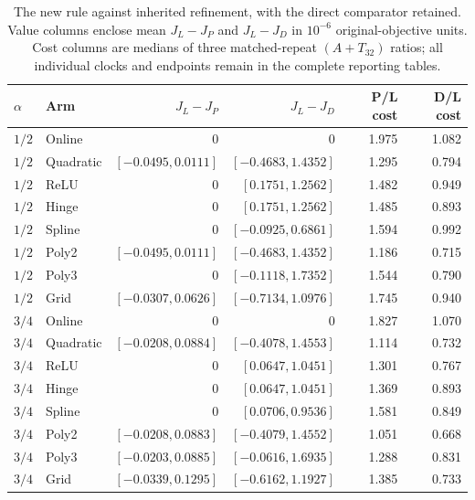 \begin{table}[htbp]
\centering\scriptsize
\setlength{\tabcolsep}{3pt}
\caption{The new rule against inherited refinement, with the direct comparator retained. Value columns enclose mean $J_L-J_P$ and $J_L-J_D$ in $10^{-6}$ original-objective units. Cost columns are medians of three matched-repeat $(A+T_{32})$ ratios; all individual clocks and endpoints remain in the complete reporting tables.}
\label{tab:incrementalcomparison120}
\begin{tabular}{llrrrr}
\toprule $\alpha$ & Arm & $J_L-J_P$ & $J_L-J_D$ & P/L cost & D/L cost \\ \midrule
$1/2$ & Online & $0$ & $0$ & 1.975 & 1.082 \\
$1/2$ & Quadratic & $[-0.0495, 0.0111]$ & $[-0.4683, 1.4352]$ & 1.295 & 0.794 \\
$1/2$ & ReLU & $0$ & $[0.1751, 1.2562]$ & 1.482 & 0.949 \\
$1/2$ & Hinge & $0$ & $[0.1751, 1.2562]$ & 1.485 & 0.893 \\
$1/2$ & Spline & $0$ & $[-0.0925, 0.6861]$ & 1.594 & 0.992 \\
$1/2$ & Poly2 & $[-0.0495, 0.0111]$ & $[-0.4683, 1.4352]$ & 1.186 & 0.715 \\
$1/2$ & Poly3 & $0$ & $[-0.1118, 1.7352]$ & 1.544 & 0.790 \\
$1/2$ & Grid & $[-0.0307, 0.0626]$ & $[-0.7134, 1.0976]$ & 1.745 & 0.940 \\
$3/4$ & Online & $0$ & $0$ & 1.827 & 1.070 \\
$3/4$ & Quadratic & $[-0.0208, 0.0884]$ & $[-0.4078, 1.4553]$ & 1.114 & 0.732 \\
$3/4$ & ReLU & $0$ & $[0.0647, 1.0451]$ & 1.301 & 0.767 \\
$3/4$ & Hinge & $0$ & $[0.0647, 1.0451]$ & 1.369 & 0.893 \\
$3/4$ & Spline & $0$ & $[0.0706, 0.9536]$ & 1.581 & 0.849 \\
$3/4$ & Poly2 & $[-0.0208, 0.0883]$ & $[-0.4079, 1.4552]$ & 1.051 & 0.668 \\
$3/4$ & Poly3 & $[-0.0203, 0.0885]$ & $[-0.0616, 1.6935]$ & 1.288 & 0.831 \\
$3/4$ & Grid & $[-0.0339, 0.1295]$ & $[-0.6162, 1.1927]$ & 1.385 & 0.733 \\
\bottomrule
\end{tabular}
\end{table}
